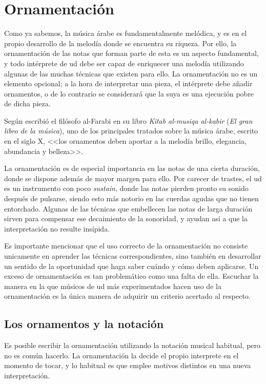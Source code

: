 \chapter{Ornamentación}
\label{ornamentacion}

Como ya sabemos, la música árabe es fundamentalmente melódica, y es en el propio desarrollo de la melodía donde se encuentra su riqueza. Por ello, la ornamentación de las notas que forman parte de esta es un aspecto fundamental, y todo intérprete de ud debe ser capaz de enriquecer una melodía utilizando algunas de las muchas técnicas que existen para ello. La ornamentación no es un elemento opcional; a la hora de interpretar una pieza, el intérprete debe añadir ornamentos, o de lo contrario se considerará que la suya es una ejecución pobre de dicha pieza.

Según escribió el filósofo al-Farabi en su libro \emph{Kitab al-musiqa al-kabir} (\emph{El gran libro de la música}), uno de los principales tratados sobre la música árabe, escrito en el siglo X, <<los ornamentos deben aportar a la melodía brillo, elegancia, abundancia y belleza>>.

La ornamentación es de especial importancia en las notas de una cierta duración, donde se dispone además de mayor margen para ello. Por carecer de trastes, el ud es un instrumento con poco \emph{sustain}, donde las notas pierden pronto su sonido después de pulsarse, siendo esto más notorio en las cuerdas agudas que no tienen entorchado. Algunas de las técnicas que embellecen las notas de larga duración sirven para compensar ese decaimiento de la sonoridad, y ayudan así a que la interpretación no resulte insípida.

Es importante mencionar que el uso correcto de la ornamentación no consiste unicamente en aprender las técnicas correspondientes, sino también en desarrollar un sentido de la oportunidad que haga saber cuándo y cómo deben aplicarse. Un exceso de ornamentación es tan problemático como una falta de ella. Escuchar la manera en la que músicos de ud más experimentados hacen uso de la ornamentación es la única manera de adquirir un criterio acertado al respecto.

\section{Los ornamentos y la notación}

Es posible escribir la ornamentación utilizando la notación musical habitual, pero no es común hacerlo. La ornamentación la decide el propio interprete en el momento de tocar, y lo habitual es que emplee motivos distintos en una nueva interpretación.

